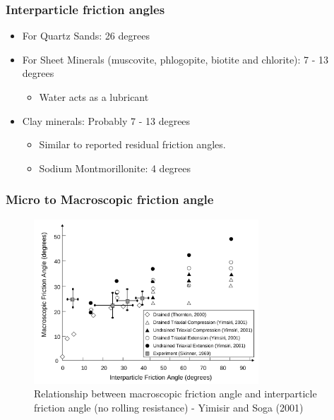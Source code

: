 \documentclass[notes]{beamer}
\begin{document}
\begin{frame}
	\frametitle{Interparticle friction angles}
	\begin{itemize}
		\item For Quartz Sands: 26 degrees
		\item  For Sheet Minerals (muscovite, phlogopite, biotite and chlorite): 7 - 13 degrees
		\begin{itemize}
			\item Water acts as a lubricant
		\end{itemize}
		\item Clay minerals: Probably 7 - 13 degrees
		\begin{itemize}
			\item Similar to reported residual friction angles.
			\item Sodium Montmorillonite: 4 degrees
		\end{itemize}
	\end{itemize}
\end{frame}

\begin{frame}
	\frametitle{Micro to Macroscopic friction angle}
	\begin{figure}
		\includegraphics[width=0.75\textwidth]{figs/macroscopic-interparticle-friction.png}
		\caption*{Relationship between macroscopic friction angle and interparticle friction angle (no rolling resistance) - Yimisir and Soga (2001)}
	\end{figure}
\end{frame}
\end{document}
